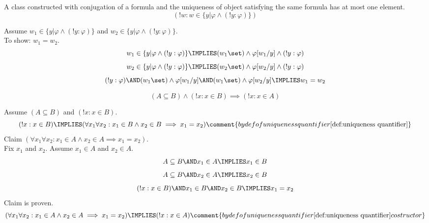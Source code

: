 \def\topic{}


\begin{theorem}
A class constructed with conjugation of a formula and the uniqueness of object satisfying the same formula has at most one element.
\label{thm:class with at most one object}
\[
(!w:w\in \{y|\varphi\land (!y:\varphi)\})
\]
\end{theorem}
\Proof
Assume $w_1\in \{y|\varphi\land (!y:\varphi)\}$ and $w_2\in \{y|\varphi\land (!y:\varphi)\}$.\\
To show: $w_1=w_2$.
\[
w_1\in \{y|\varphi\land (!y:\varphi)\}
\IMPLIES
(w_1\set)
\land
\varphi[w_1/y]
\land
(!y:\varphi)
\]
\[
w_2\in \{y|\varphi\land (!y:\varphi)\}
\IMPLIES
(w_2\set)
\land
\varphi[w_2/y]
\land
(!y:\varphi)
\]
\[
(!y:\varphi)
\AND
(w_1\set)\land\varphi[w_1/y]
\AND
(w_1\set)\land\varphi[w_2/y]
\IMPLIES
w_1=w_2
\]
\Done

\begin{theorem}
\[
(A\subseteq B)\land(!x:x\in B)\implies (!x:x\in A)
\]
\end{theorem}
\Proof
Assume $(A\subseteq B)$ and $(!x:x\in B)$.
\[
(!x:x\in B)
\IMPLIES
(\forall x_1\forall x_2: x_1\in B \land x_2\in B \implies x_1=x_2)
\comment{by def of uniqueness quantifier \ref{def:uniqueness quantifier}}
\]
Claim $(\forall x_1\forall x_2: x_1\in A \land x_2\in A \implies x_1=x_2)$.\\
Fix $x_1$ and $x_2$.
Assume $x_1\in A$ and $x_2\in A$. 
\[
A\subseteq B
\AND
x_1\in A
\IMPLIES
x_1\in B
\]
\[
A\subseteq B
\AND
x_2\in A
\IMPLIES
x_2\in B
\]
\[
(!x:x\in B)
\AND
x_1\in B
\AND
x_2\in B
\IMPLIES
x_1=x_2
\]
Claim is proven.
\[
(\forall x_1\forall x_2: x_1\in A \land x_2\in A \implies x_1=x_2)
\IMPLIES
(!x:x\in A)
\comment{by def of uniqueness quantifier \ref{def:uniqueness quantifier} costructor}
\]
\Done

